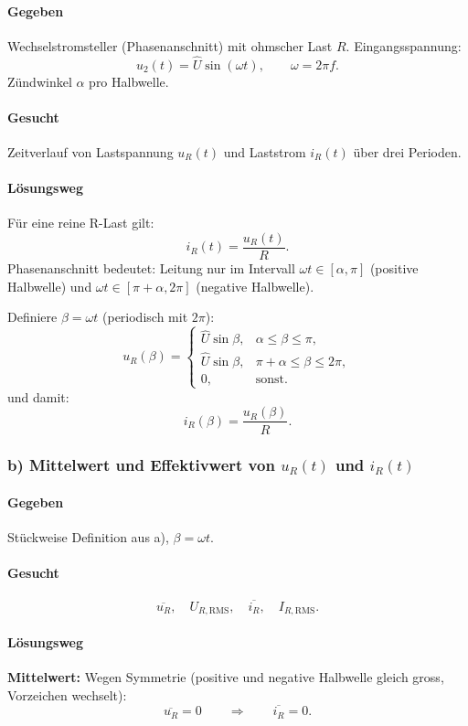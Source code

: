 \paragraph{Gegeben}
Wechselstromsteller (Phasenanschnitt) mit ohmscher Last $R$.
Eingangsspannung:
\[
u_2(t)=\hat U \sin(\omega t),\qquad \omega=2\pi f.
\]
Zündwinkel $\alpha$ pro Halbwelle.

\paragraph{Gesucht}
Zeitverlauf von Lastspannung $u_R(t)$ und Laststrom $i_R(t)$ über drei Perioden.

\paragraph{Lösungsweg}
Für eine reine R-Last gilt:
\[
i_R(t)=\frac{u_R(t)}{R}.
\]
Phasenanschnitt bedeutet: Leitung nur im Intervall $\omega t\in[\alpha,\pi]$ (positive Halbwelle)
und $\omega t\in[\pi+\alpha,2\pi]$ (negative Halbwelle).

Definiere $\beta=\omega t$ (periodisch mit $2\pi$):
\[
u_R(\beta)=
\begin{cases}
\hat U \sin\beta, & \alpha \le \beta \le \pi,\\[4pt]
\hat U \sin\beta, & \pi+\alpha \le \beta \le 2\pi,\\[4pt]
0, & \text{sonst.}
\end{cases}
\]
und damit:
\[
i_R(\beta)=\frac{u_R(\beta)}{R}.
\]


\subsubsection*{b) Mittelwert und Effektivwert von $u_R(t)$ und $i_R(t)$}

\paragraph{Gegeben}
Stückweise Definition aus a), $\beta=\omega t$.

\paragraph{Gesucht}
\[
\overline{u_R},\quad U_{R,\mathrm{RMS}},\quad \overline{i_R},\quad I_{R,\mathrm{RMS}}.
\]

\paragraph{Lösungsweg}
\textbf{Mittelwert:}
Wegen Symmetrie (positive und negative Halbwelle gleich gross, Vorzeichen wechselt):
\[
\boxed{\overline{u_R}=0}
\qquad\Rightarrow\qquad
\boxed{\overline{i_R}=0}.
\]


